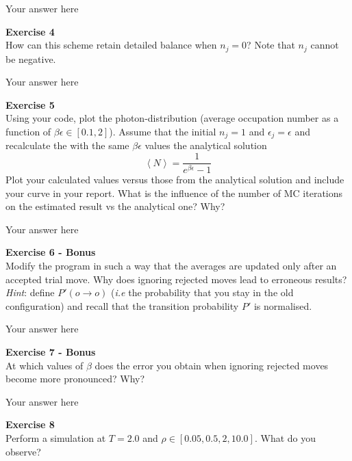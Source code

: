 \documentclass{article}
\begin{document}
Your answer here

\begin{mdframed}
\textbf{Exercise 4}\\
How can this scheme retain detailed balance when $n_j = 0$? Note that $n_j$  cannot be negative.
\end{mdframed}

Your answer here

\begin{mdframed}
\textbf{Exercise 5}\\
Using your code, plot the photon-distribution (average occupation number as a function of $\beta\epsilon\in[0.1,2]$).
Assume that the initial $n_j =1$ and $\epsilon_j=\epsilon$ and recalculate the with the same $\beta\epsilon$ values the analytical solution
\begin{equation}
\left< N \right> = \frac{1}{e^{\beta\epsilon}-1}
\end{equation}
Plot your calculated values versus those from the analytical solution and include your curve in your report. What is the influence of the number of MC iterations on the estimated result vs the analytical one? Why?
\end{mdframed}

Your answer here

\begin{mdframed}
\textbf{Exercise 6 - Bonus}\\
Modify the program in such a way that the averages are updated only after an accepted trial move. Why does ignoring rejected moves lead to erroneous results? \textit{Hint}: define $P'(o \rightarrow o)$ (\textit{i.e}  the probability that you stay in the old configuration) and recall that the transition probability $P'$ is normalised.
\end{mdframed}

Your answer here

\begin{mdframed}
\textbf{Exercise 7 - Bonus}\\
At which values of $\beta$ does the error you obtain when ignoring rejected moves become more pronounced? Why?
\end{mdframed}

Your answer here

\begin{mdframed}
\textbf{Exercise 8}\\
Perform a simulation at $T = 2.0$ and $\rho \in [0.05, 0.5, 2, 10.0]$. What do you observe?
\end{mdframed}
\end{document}
